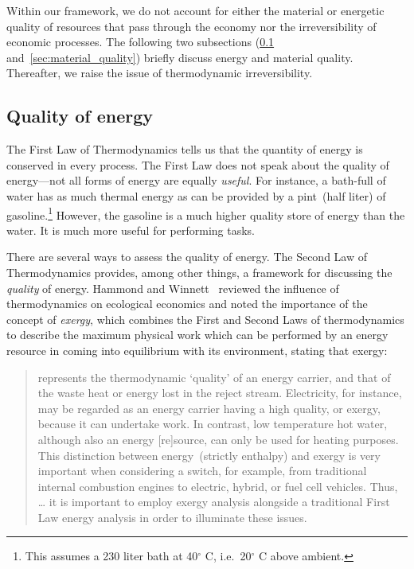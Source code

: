 Within our framework, we do not account for either
the material or energetic quality of resources 
that pass through the economy nor the 
irreversibility of economic processes.
The following two subsections (\ref{sec:energy_quality}
and~\ref{sec:material_quality}) briefly discuss energy and material quality.
Thereafter, we raise the issue of thermodynamic irreversibility.


\subsection{Quality of energy}
\label{sec:energy_quality}

The First Law of Thermodynamics 
tells us that
the quantity of energy is conserved in every process.
The First Law does not speak about the quality of energy---not
all forms of energy are equally \emph{useful}.
For instance,
a bath-full of water has as much thermal energy
as can be provided by a pint~(half liter) of
gasoline.\footnote{This assumes a 230 liter bath at
40$^\circ$ C,
i.e.\ 20$^\circ$ C above ambient.}
However, the gasoline is a much higher quality
store of energy than the water.
It is much more useful for performing tasks.

There are several ways to assess the quality of energy.
The Second Law of Thermodynamics provides, 
among other things,
a framework for discussing the \emph{quality} of energy.
Hammond and Winnett~\cite{Hammond:2009tu} reviewed
the influence of thermodynamics on ecological economics 
and noted the importance of the concept of \emph{exergy},
which combines the First and Second Laws of thermodynamics
to describe the maximum physical work 
which can be performed by an energy resource
in coming into equilibrium with its environment,
stating that exergy:

\begin{quote}
	represents the thermodynamic `quality' 
	of an energy carrier, 
	and that of the waste heat or energy lost in the reject stream. 
	Electricity, for instance, 
	may be regarded as an energy carrier having a high quality, 
	or exergy, because it can undertake work. 
	In contrast, low temperature hot water, 
	although also an energy [re]source, 
	can only be used for heating purposes. 
	This distinction between energy~(strictly enthalpy) 
	and exergy is very important 
	when considering a switch, for example, 
	from traditional internal combustion engines 
	to electric, hybrid, or fuel cell vehicles. 
	Thus, \ldots{} it is important to employ exergy analysis 
	alongside a traditional First Law energy analysis 
	in order to illuminate these issues.
\end{quote}

